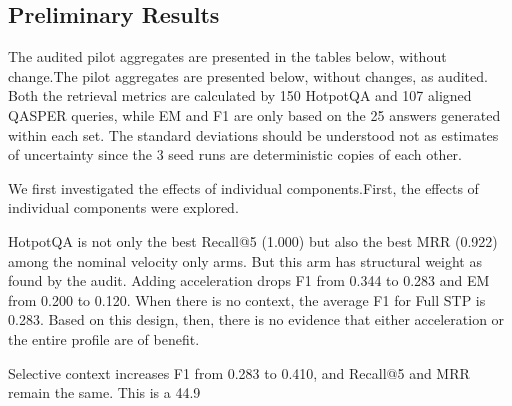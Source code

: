 \documentclass[10pt,a4paper]{article}
\begin{document}
\subsection{Preliminary Results}

The audited pilot aggregates are presented in the tables below, without change.The pilot aggregates are presented below, without changes, as audited. Both the retrieval metrics are calculated by 150 HotpotQA and 107 aligned QASPER queries, while EM and F1 are only based on the 25 answers generated within each set. The standard deviations should be understood not as estimates of uncertainty since the 3 seed runs are deterministic copies of each other.

\begin{table}[!htbp]
\caption{Pilots for aggregates, HotpotQA. The 25 questions used for EM/F1 don't include any inferential uncertainty regarding variation across seeds.}
\label{tab:hotpotqa}
\centering\scriptsize
\setlength{\tabcolsep}{2pt}
\renewcommand{\arraystretch}{1.14}

\end{table}

\begin{table}[!htbp]
\caption{Pilot aggregates on QASPER. Retrieval leaves out the 42 questions that could not be aligned; EM/F1 is based on 25 questions.}
\label{tab:qasper}
\centering\scriptsize
\setlength{\tabcolsep}{2pt}
\renewcommand{\arraystretch}{1.14}

\end{table}

We first investigated the effects of individual components.First, the effects of individual components were explored.

HotpotQA is not only the best Recall@5 (1.000) but also the best MRR (0.922) among the nominal velocity only arms. But this arm has structural weight as found by the audit. Adding acceleration drops F1 from 0.344 to 0.283 and EM from 0.200 to 0.120. When there is no context, the average F1 for Full STP is 0.283. Based on this design, then, there is no evidence that either acceleration or the entire profile are of benefit.

Selective context increases F1 from 0.283 to 0.410, and Recall@5 and MRR remain the same. This is a 44.9%
\end{document}
